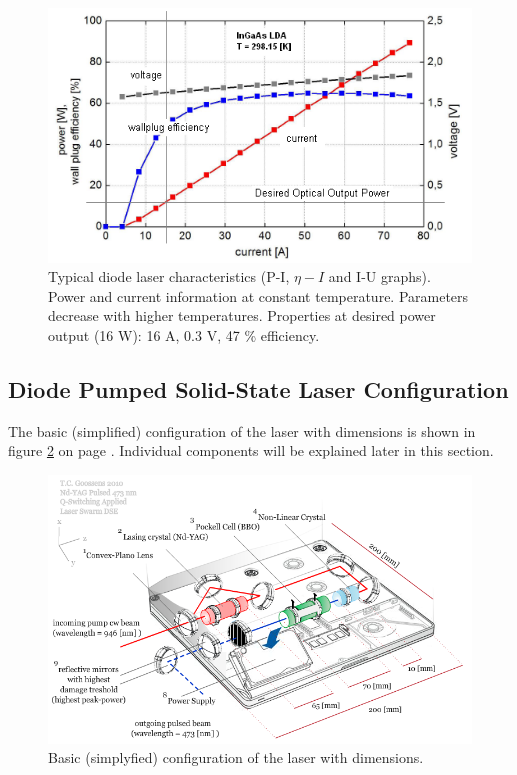 \begin{figure} [ht]
\centering
\includegraphics[scale=0.5]{chapters/img/laser_power.png}	
\caption{Typical diode \acs{laser} characteristics (P-I, $\eta-I$ and I-U graphs). Power and current information at constant temperature. Parameters decrease with higher temperatures. Properties at desired power output (16 W): 16 A, 0.3 V, 47 \% efficiency.}
\label{diode_laser_char}
\end{figure}

\subsection{Diode Pumped Solid-State Laser Configuration} 
\label{laserconfig}

The basic (simplified) configuration of the \acs{laser} with dimensions is shown in figure \ref{laser_dimension} on page \pageref{laser_dimension}. Individual components will be explained later in this section.

\begin{figure} [ht]
\centering
\includegraphics[scale=0.5]{chapters/img/laserconfig.png}	
\caption{Basic (simplyfied) configuration of the \acs{laser} with dimensions.}
\label{laser_dimension}
\end{figure}

